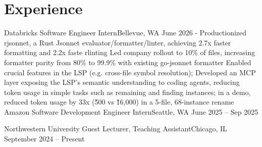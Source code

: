 \justifying
\section*{Experience}%
\noindent
\resumeExperience
{Databricks} {Software Engineer Intern}{Bellevue, WA} {June 2026 -}
\resumeItemListStart
\resumeItem Productionized rjsonnet, a Rust Jsonnet evaluator/formatter/linter, achieving 2.7x faster formatting and 2.2x faste rlinting
\resumeItem Led company rollout to 10\% of files, increasing formatter parity from 80\% to 99.9\% with existing go-jsonnet formatter
\resumeItem Enabled crucial features in the LSP (e.g. cross-file symbol resolution); Developed an MCP layer exposing the LSP's semantic understanding to coding agents, reducing token usage in simple tasks such as remaining and finding instances; in a demo, reduced token usage by 33x (\~500 vs \~16,000) in a 5-file, 68-instance rename
\resumeItemListEnd
\resumeExperience
{Amazon} {Software Development Engineer Intern}{Seattle, WA} {June 2025 -- Sep 2025}
\resumeItemListStart
{}
\resumeItemListEnd

\resumeExperience
{Northwestern University} {Guest Lecturer, Teaching Assistant}{Chicago, IL} {September 2024 -- Present}
\resumeItemListStart
{}
\resumeItemListEnd

